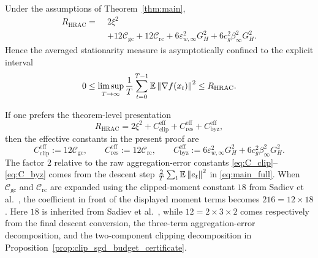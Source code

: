 \begin{corollary}
\label{cor:refined_beta2_floor}
Under the assumptions of Theorem~\ref{thm:main},
\begin{align}
    R_{\mathrm{HRAC}}
    =\;&
    2\xi^2
    \nonumber\\
    &+
    12\mathcal C_{\mathrm{gc}}
    +
    12\mathcal C_{\mathrm{rc}}
    +
    6\varepsilon_{w,\infty}^2G_H^2
    +
    6c_g^2\beta_\infty^2G_H^2.
    \label{eq:R_HRAC_explicit}
\end{align}
Hence the averaged stationarity measure is asymptotically confined to the
explicit interval
\begin{equation}
    0
    \le
    \limsup_{T\to\infty}
    \frac{1}{T}\sum_{t=0}^{T-1}\mathbb{E}\left\lVert \nabla f(x_t) \right\rVert^2
    \le
    R_{\mathrm{HRAC}}.
    \label{eq:HRAC_interval}
\end{equation}
\end{corollary}

\begin{remark}
\label{rem:schematic_R_HRAC}
If one prefers the theorem-level presentation
\[
    R_{\mathrm{HRAC}}
    =
    2\xi^2
    +
    C_{\mathrm{clip}}^{\mathrm{eff}}
    +
    C_{\mathrm{res}}^{\mathrm{eff}}
    +
    C_{\mathrm{byz}}^{\mathrm{eff}},
\]
then the effective constants in the present proof are
\[
    C_{\mathrm{clip}}^{\mathrm{eff}}
    := 12\mathcal C_{\mathrm{gc}},\qquad
    C_{\mathrm{res}}^{\mathrm{eff}}
    := 12\mathcal C_{\mathrm{rc}},\qquad
    C_{\mathrm{byz}}^{\mathrm{eff}}
    := 6\varepsilon_{w,\infty}^2G_H^2
       +6c_g^2\beta_\infty^2G_H^2.
\]
The factor \(2\) relative to the raw aggregation-error constants
\eqref{eq:C_clip}--\eqref{eq:C_byz} comes from the descent step
\(
\frac{2}{T}\sum_t \mathbb{E}\left\lVert e_t \right\rVert^2
\)
in \eqref{eq:main_full}.
When \(\mathcal C_{\mathrm{gc}}\) and \(\mathcal C_{\mathrm{rc}}\) are
expanded using the clipped-moment constant \(18\) from
Sadiev et al.~\cite[Lemma~5.1]{sadiev2023highprob}, the coefficient
in front of the displayed moment terms becomes \(216=12\times18\). Here
\(18\) is inherited from Sadiev et al.~\cite[Lemma~5.1]{sadiev2023highprob},
while \(12=2\times3\times2\) comes respectively from the final descent
conversion, the three-term aggregation-error decomposition, and the
two-component clipping decomposition in
Proposition~\ref{prop:clip_sgd_budget_certificate}.
\end{remark}

